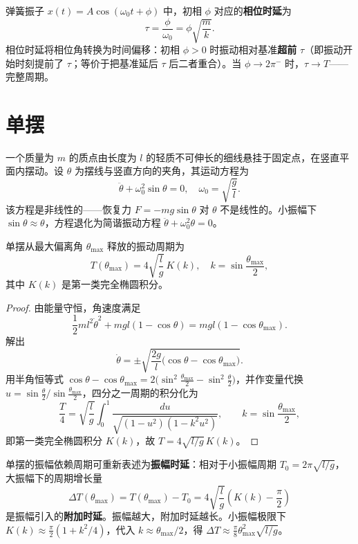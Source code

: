\begin{definition}[弹簧振子的相位时延]\label{def:spring_phase_delay}
弹簧振子 $x(t) = A\cos(\omega_0 t + \phi)$ 中，初相 $\phi$ 对应的\textbf{相位时延}为
\[
\tau = \frac{\phi}{\omega_0} = \phi \sqrt{\frac{m}{k}}.
\]
相位时延将相位角转换为时间偏移：初相 $\phi>0$ 时振动相对基准\textbf{超前} $\tau$（即振动开始时刻提前了 $\tau$；等价于把基准延后 $\tau$ 后二者重合）。当 $\phi \to 2\pi^-$ 时，$\tau \to T$——完整周期。
\end{definition}

\section{单摆}

\begin{definition}[单摆]\label{def:simple_pendulum}
一个质量为 $m$ 的质点由长度为 $l$ 的轻质不可伸长的细线悬挂于固定点，在竖直平面内摆动。设 $\theta$ 为摆线与竖直方向的夹角，其运动方程为
\[
\ddot{\theta} + \omega_0^2 \sin\theta = 0, \quad \omega_0 = \sqrt{\frac{g}{l}}.
\]
该方程是非线性的——恢复力 $F = -mg\sin\theta$ 对 $\theta$ 不是线性的。小振幅下 $\sin\theta \approx \theta$，方程退化为简谐振动方程 $\ddot{\theta} + \omega_0^2 \theta = 0$。
\end{definition}

\begin{theorem}\label{thm:pendulum_exact_period}
单摆从最大偏离角 $\theta_{\max}$ 释放的振动周期为
\[
T(\theta_{\max}) = 4\sqrt{\frac{l}{g}} \, K(k), \quad k = \sin\frac{\theta_{\max}}{2},
\]
其中 $K(k)$ 是第一类完全椭圆积分。
\end{theorem}

\begin{proof}
由能量守恒，角速度满足
\[
\frac{1}{2}ml^2\dot\theta^2 + mgl(1-\cos\theta) = mgl(1-\cos\theta_{\max}).
\]
解出
\[
\dot\theta = \pm \sqrt{\frac{2g}{l}\big(\cos\theta - \cos\theta_{\max}\big)}.
\]
用半角恒等式 $\cos\theta - \cos\theta_{\max} = 2\big(\sin^2\frac{\theta_{\max}}{2} - \sin^2\frac{\theta}{2}\big)$，并作变量代换 $u = \sin\frac{\theta}{2}/\sin\frac{\theta_{\max}}{2}$，四分之一周期的积分化为
\[
\frac{T}{4} = \sqrt{\frac{l}{g}} \int_0^1 \frac{du}{\sqrt{(1-u^2)(1-k^2u^2)}}, \qquad k = \sin\frac{\theta_{\max}}{2},
\]
即第一类完全椭圆积分 $K(k)$，故 $T = 4\sqrt{l/g}\, K(k)$。
\end{proof}

\begin{definition}[单摆的振幅时延]\label{def:pendulum_amplitude_delay}
单摆的振幅依赖周期可重新表述为\textbf{振幅时延}：相对于小振幅周期 $T_0 = 2\pi\sqrt{l/g}$，大振幅下的周期增长量
\[
\Delta T(\theta_{\max}) = T(\theta_{\max}) - T_0 = 4\sqrt{\frac{l}{g}}\left(K(k) - \frac{\pi}{2}\right)
\]
是振幅引入的\textbf{附加时延}。振幅越大，附加时延越长。小振幅极限下 $K(k) \approx \frac{\pi}{2}(1 + k^2/4)$，代入 $k \approx \theta_{\max}/2$，得 $\Delta T \approx \frac{\pi}{8}\theta_{\max}^2\sqrt{l/g}$。
\end{definition}

